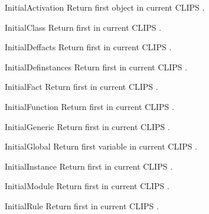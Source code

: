 \begin{funcdesc}{InitialActivation}{}
Return first  object in current CLIPS
.
\end{funcdesc}

\begin{funcdesc}{InitialClass}{}
Return first  in current CLIPS .
\end{funcdesc}

\begin{funcdesc}{InitialDeffacts}{}
Return first  in current CLIPS .
\end{funcdesc}

\begin{funcdesc}{InitialDefinstances}{}
Return first  in current CLIPS .
\end{funcdesc}

\begin{funcdesc}{InitialFact}{}
Return first  in current CLIPS .
\end{funcdesc}

\begin{funcdesc}{InitialFunction}{}
Return first  in current CLIPS .
\end{funcdesc}

\begin{funcdesc}{InitialGeneric}{}
Return first  in current CLIPS .
\end{funcdesc}

\begin{funcdesc}{InitialGlobal}{}
Return first  variable in current CLIPS
.
\end{funcdesc}

\begin{funcdesc}{InitialInstance}{}
Return first  in current CLIPS .
\end{funcdesc}

\begin{funcdesc}{InitialModule}{}
Return first  in current CLIPS .
\end{funcdesc}

\begin{funcdesc}{InitialRule}{}
Return first  in current CLIPS .
\end{funcdesc}

